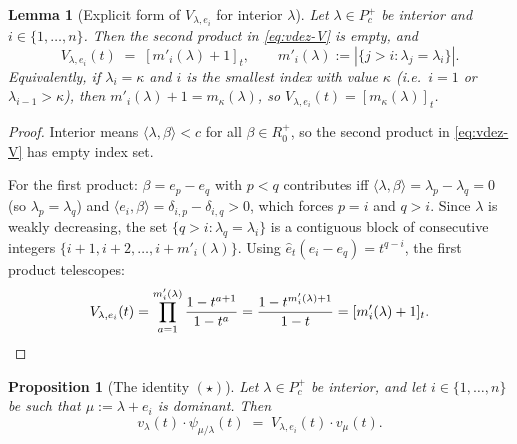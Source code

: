 \documentclass[11pt]{article}
\newtheorem{lemma}[theorem]{Lemma}
\newtheorem{proposition}[theorem]{Proposition}
\theoremstyle{definition}
\newcommand{\Pcp}{P_c^+}
\newcommand{\Rplus}{R_0^+}
\newcommand{\ip}[2]{\langle #1, #2 \rangle}
\newcommand{\eh}{\hat{e}_t}
\begin{document}
\begin{lemma}[Explicit form of $V_{\lambda,e_i}$ for interior $\lambda$]
\label{lem:V-explicit}
Let $\lambda \in \Pcp$ be interior and $i \in \{1,\ldots,n\}$. Then
the second product in \eqref{eq:vdez-V} is empty, and
\begin{equation}
V_{\lambda, e_i}(t) \;=\; \left[m'_i(\lambda) + 1\right]_t,
\qquad m'_i(\lambda) := |\{j > i : \lambda_j = \lambda_i\}|.
\label{eq:V-explicit}
\end{equation}
Equivalently, if $\lambda_i = \kappa$ and $i$ is the smallest index with
value $\kappa$ (i.e.\ $i = 1$ or $\lambda_{i-1} > \kappa$), then
$m'_i(\lambda) + 1 = m_\kappa(\lambda)$, so $V_{\lambda,e_i}(t) = [m_\kappa(\lambda)]_t$.
\end{lemma}

\begin{proof}
Interior means $\ip{\lambda}{\beta} < c$ for all $\beta \in \Rplus$, so the
second product in \eqref{eq:vdez-V} has empty index set.

For the first product: $\beta = e_p - e_q$ with $p < q$ contributes iff
$\ip{\lambda}{\beta} = \lambda_p - \lambda_q = 0$ (so $\lambda_p = \lambda_q$)
and $\ip{e_i}{\beta} = \delta_{i,p} - \delta_{i,q} > 0$, which forces $p = i$
and $q > i$. Since $\lambda$ is weakly decreasing, the set
$\{q > i : \lambda_q = \lambda_i\}$ is a contiguous block of consecutive
integers $\{i+1, i+2, \ldots, i + m'_i(\lambda)\}$. Using $\eh(e_i - e_q) = t^{q-i}$,
the first product telescopes:
\[
V_{\lambda,e_i}(t) = \prod_{a=1}^{m'_i(\lambda)} \frac{1 - t^{a+1}}{1 - t^a}
= \frac{1 - t^{m'_i(\lambda)+1}}{1-t}
= [m'_i(\lambda)+1]_t. \qedhere
\]
\end{proof}

\begin{proposition}[The identity $(\star)$]
\label{prop:star}
Let $\lambda \in \Pcp$ be interior, and let $i \in \{1,\ldots,n\}$ be such
that $\mu := \lambda + e_i$ is dominant. Then
\begin{equation}
v_\lambda(t) \cdot \psi_{\mu/\lambda}(t) \;=\; V_{\lambda, e_i}(t) \cdot v_\mu(t).
\tag{$\star$}
\label{eq:star}
\end{equation}
\end{proposition}
\end{document}
